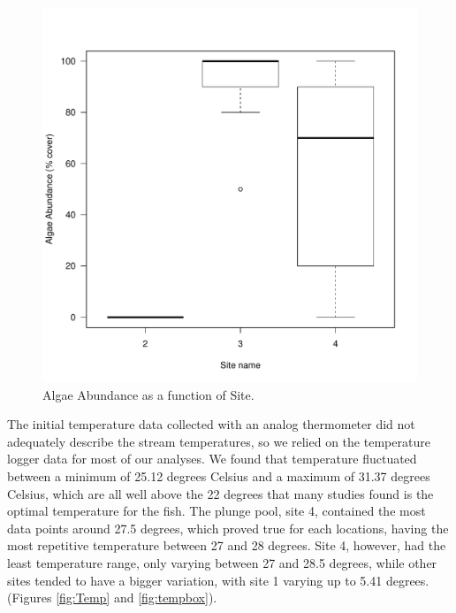 \documentclass{article}\usepackage[]{graphicx}\usepackage[]{color}
\makeatletter
\def\maxwidth{ %
  \ifdim\Gin@nat@width>\linewidth
    \linewidth
  \else
    \Gin@nat@width
  \fi
}
\newenvironment{knitrout}{}{} %
\makeatother
\begin{document}
\begin{figure}[!ht]
\begin{knitrout}
\color{fgcolor}
\includegraphics[width=\maxwidth]{figure/unnamed-chunk-4-1} 

\end{knitrout}
\caption{Algae Abundance as a function of Site.}
\label{fig:algaesite}
\end{figure}

The initial temperature data collected with an analog thermometer did not adequately describe the stream temperatures, so we relied on the temperature logger data for most of our analyses. We found that temperature fluctuated between a minimum of 25.12 degrees Celsius and a maximum of 31.37 degrees Celsius, which are all well above the 22 degrees that many studies found is the optimal temperature for the fish. The plunge pool, site 4, contained the most data points around 27.5 degrees, which proved true for each locations, having the most repetitive temperature between 27 and 28 degrees. Site 4, however, had the least temperature range, only varying between 27 and 28.5 degrees, while other sites tended to have a bigger variation, with site 1 varying up to 5.41 degrees. (Figures \ref{fig:Temp} and \ref{fig:tempbox}).
\end{document}
